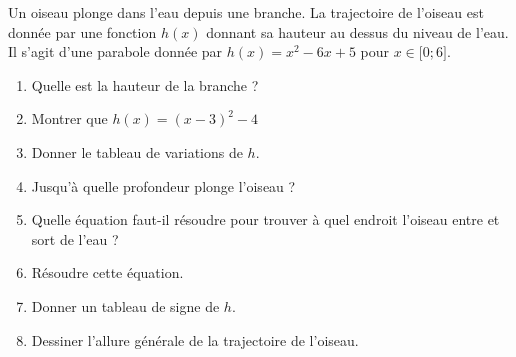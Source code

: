 
\begin{exercice}\label{exosmath-0658}

    Un oiseau plonge dans l'eau depuis une branche. La trajectoire de l'oiseau est donnée par une fonction \( h(x)\) donnant sa hauteur au dessus du niveau de l'eau. Il s'agit d'une parabole donnée par \( h(x)=x^2-6x+5\) pour \( x\in\mathopen[ 0 ; 6 \mathclose]\).

    \begin{enumerate}
        \item
            Quelle est la hauteur de la branche ?
        \item
            Montrer que \( h(x)=(x-3)^2-4\)
        \item
            Donner le tableau de variations de \( h\).
        \item
            Jusqu'à quelle profondeur plonge l'oiseau ?
        \item
            Quelle équation faut-il résoudre pour trouver à quel endroit l'oiseau entre et sort de l'eau ?
        \item
            Résoudre cette équation.
        \item
            Donner un tableau de signe de \( h\).
        \item
            Dessiner l'allure générale de la trajectoire de l'oiseau.
    \end{enumerate}

\end{exercice}

